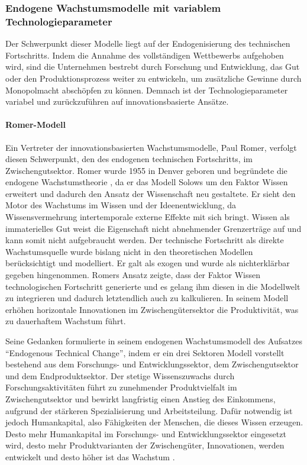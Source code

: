 \subsubsection{Endogene Wachstumsmodelle mit variablem Technologieparameter}
Der Schwerpunkt dieser Modelle liegt auf der Endogenisierung des technischen Fortschritts. Indem die Annahme des vollständigen Wettbewerbs aufgehoben wird, sind die Unternehmen bestrebt durch Forschung und Entwicklung, das Gut oder den Produktionsprozess weiter zu entwickeln, um zusätzliche Gewinne durch Monopolmacht abschöpfen zu können. Demnach ist der Technologieparameter variabel und zurückzuführen auf innovationsbasierte Ansätze. 


\paragraph{Romer-Modell}
Ein Vertreter der innovationsbasierten Wachstumsmodelle, Paul Romer, verfolgt diesen Schwerpunkt, den des endogenen technischen Fortschritts, im Zwischengutsektor. Romer wurde 1955 in Denver geboren und begr{\"u}ndete die endogene Wachstumstheorie \citep{Lin.2007}, da er das Modell Solows um den Faktor Wissen erweitert und dadurch den Ansatz der Wissenschaft neu gestaltete. Er sieht den Motor des Wachstums im Wissen und der Ideenentwicklung, da Wissensvermehrung intertemporale externe Effekte mit sich bringt. Wissen als immaterielles Gut weist die Eigenschaft nicht abnehmender Grenzertr{\"a}ge auf und kann somit nicht aufgebraucht werden. Der technische Fortschritt als direkte Wachstumsquelle wurde bislang nicht in den theoretischen Modellen ber{\"u}cksichtigt und modelliert. Er galt als exogen und wurde als nichterkl{\"a}rbar gegeben hingenommen.
Romers Ansatz zeigte, dass der Faktor Wissen technologischen Fortschritt generierte und es gelang ihm diesen in die Modellwelt zu integrieren und dadurch letztendlich auch zu kalkulieren. In seinem Modell erhöhen horizontale Innovationen im Zwischengütersektor die Produktivität, was zu dauerhaftem Wachstum führt.\newline

Seine Gedanken formulierte \citet{Romer.1990} in seinem endogenen Wachstumsmodell des Aufsatzes "`Endogenous Technical Change"', indem er ein drei Sektoren Modell vorstellt bestehend aus dem Forschungs- und Entwicklungssektor, dem Zwischengutsektor und dem Endproduktsektor. Der stetige Wissenszuwachs durch Forschungsaktivitäten f{\"u}hrt zu zunehmender Produktvielfalt im Zwischengutsektor und bewirkt langfristig einen Anstieg des Einkommens, aufgrund der stärkeren Spezialisierung und Arbeitsteilung. Daf{\"u}r notwendig ist jedoch Humankapital, also F{\"a}higkeiten der Menschen, die dieses Wissen erzeugen. Desto mehr Humankapital im Forschungs- und Entwicklungssektor eingesetzt wird, desto mehr Produktvarianten der Zwischengüter, Innovationen, werden entwickelt und desto höher ist das Wachstum \citep{Romer.1990}.\newline


